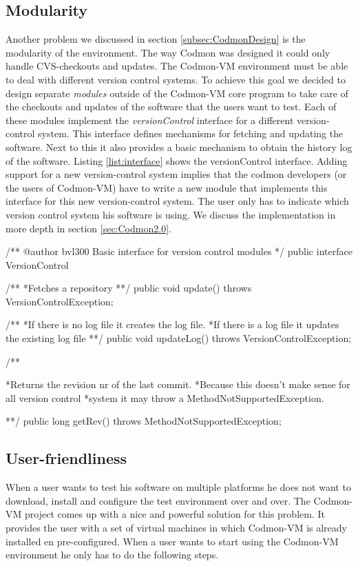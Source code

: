 \documentclass{article}
\newcommand{\project}{Codmon-VM}
\begin{document}
\subsection{Modularity}
\label{road:modular}
Another problem we discussed in section \ref{subsec:CodmonDesign} is the modularity of the environment. The way Codmon was designed it could only handle CVS-checkouts and updates. The \project{} 
environment must be able to deal with different version control systems. To achieve this goal we decided to design separate \emph{modules} outside of the \project{} core program to take care of the checkouts and updates of the 
software that the users want to test. Each of these modules implement the \emph{versionControl} interface for a different version-control system.
This interface defines mechanisms for fetching and updating the software.
Next to this it 
also provides a basic mechanism to obtain the history log of the software.
Listing \ref{list:interface} shows the versionControl interface.
Adding support for a new version-control system implies that the codmon developers 
(or the users of \project{}) have to write a new module that implements this interface for this new version-control system.
The user only has to indicate which version control system his 
software is using. We discuss the implementation in more depth in section \ref{sec:Codmon2.0}.\\

\begin{code}[frame=shadowbox, language=Java,showstringspaces=false]
/**
@author bvl300 
Basic interface for version control modules
*/
public interface VersionControl{
	
	/**
	*Fetches a repository
	**/
	public void update() throws VersionControlException;
	
	/**
	*If there is no log file it creates the log file. 
	*If there is a log file it updates the existing log file
	**/
	public void updateLog() throws VersionControlException;


	/**

	*Returns the revision nr of the last commit.
	*Because this doesn't make sense for all version control
	*system it may throw a MethodNotSupportedException.

	**/
	public long getRev() throws MethodNotSupportedException;
}
\end{code}


\subsection{User-friendliness}
\label{road:user}
When a user wants to test his software on multiple platforms he does not want to download, install and configure the test environment over and over. The \project{} project comes up with a nice and powerful 
solution for this problem. It provides the user with a set of virtual machines in which \project{} is already installed en pre-configured. When a user wants to start using the \project{} environment he only 
has to do the following steps.
\end{document}
